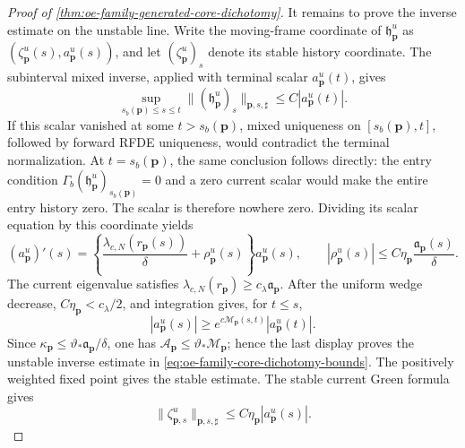 \begin{proof}[Proof of
\cref{thm:oe-family-generated-core-dichotomy}]
It remains to prove the inverse estimate on the unstable line.  Write the
moving-frame coordinate of \(\mathfrak h_{\mathbf p}^u\) as
\((\zeta_{\mathbf p}^u(s),a_{\mathbf p}^u(s))\), and let
\((\zeta_{\mathbf p}^u)_s\) denote its stable history coordinate.  The
subinterval mixed
inverse, applied with terminal scalar \(a_{\mathbf p}^u(t)\), gives
\begin{equation}
 \sup_{s_b(\mathbf p)\le s\le t}
 \|(\mathfrak h_{\mathbf p}^u)_s\|_{
      \mathbf p,s,\sharp}
 \le C|a_{\mathbf p}^u(t)|.                    \label{eq:proof-oe-family-core-local-unstable-control}
\end{equation}
If this scalar vanished at some \(t>s_b(\mathbf p)\), mixed uniqueness on
\([s_b(\mathbf p),t]\), followed by forward RFDE uniqueness, would
contradict the terminal normalization.  At \(t=s_b(\mathbf p)\), the same
conclusion follows directly: the entry condition
\(\Gamma_b(\mathfrak h_{\mathbf p}^u)_{s_b(\mathbf p)}=0\) and a zero
current scalar would make the entire entry history zero.  The scalar is
therefore nowhere zero.  Dividing its scalar equation by this coordinate
yields
\begin{equation}
 (a_{\mathbf p}^u)'(s)
 =\left\{\frac{\lambda_{c,N}(r_{\mathbf p}(s))}\delta
       +\rho_{\mathbf p}^u(s)\right\}a_{\mathbf p}^u(s),
 \qquad
 |\rho_{\mathbf p}^u(s)|
 \le C\eta_{\mathbf p}
       \frac{\mathfrak a_{\mathbf p}(s)}\delta.             \label{eq:proof-oe-family-core-unstable-amplitude}
\end{equation}
The current eigenvalue satisfies
\(\lambda_{c,N}(r_{\mathbf p})\ge
c_\lambda\mathfrak a_{\mathbf p}\).  After the uniform wedge decrease,
\(C\eta_{\mathbf p}<c_\lambda/2\), and integration gives, for
\(t\le s\),
\begin{equation}
 |a_{\mathbf p}^u(s)|
 \ge e^{c\mathscr M_{\mathbf p}(s,t)}
       |a_{\mathbf p}^u(t)|.                   \label{eq:proof-oe-family-core-unstable-growth}
\end{equation}
Since \(\kappa_{\mathbf p}\le
\vartheta_*\mathfrak a_{\mathbf p}/\delta\), one has
\(\mathscr A_{\mathbf p}\le
\vartheta_*\mathscr M_{\mathbf p}\); hence the last display proves the
unstable inverse estimate in
\cref{eq:oe-family-core-dichotomy-bounds}.  The positively weighted fixed
point gives the stable estimate.  The stable current Green formula gives
\begin{equation}
 \|\zeta_{\mathbf p,s}^u\|_{
       \mathbf p,s,\sharp}
 \le C\eta_{\mathbf p}|a_{\mathbf p}^u(s)|.     \label{eq:proof-oe-family-core-unstable-stable-graph}

\end{equation}
\end{proof}

